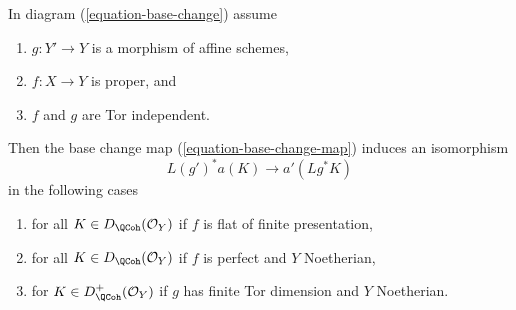 \begin{lemma}
\label{lemma-more-base-change}
In diagram (\ref{equation-base-change}) assume
\begin{enumerate}
\item $g : Y' \to Y$ is a morphism of affine schemes,
\item $f : X \to Y$ is proper, and
\item $f$ and $g$ are Tor independent.
\end{enumerate}
Then the base change map (\ref{equation-base-change-map}) induces an
isomorphism
$$
L(g')^*a(K) \longrightarrow a'(Lg^*K)
$$
in the following cases
\begin{enumerate}
\item for all $K \in D_\QCoh(\mathcal{O}_Y)$ if $f$
is flat of finite presentation,
\item for all $K \in D_\QCoh(\mathcal{O}_Y)$ if $f$
is perfect and $Y$ Noetherian,
\item for $K \in D_\QCoh^+(\mathcal{O}_Y)$ if $g$ has finite Tor dimension
and $Y$ Noetherian.
\end{enumerate}
\end{lemma}

